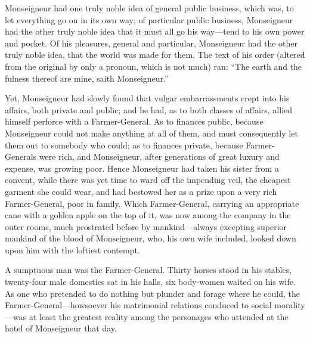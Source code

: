 Monseigneur had one truly noble idea of general public business,
which was, to let everything go on in its own way; of particular
public business, Monseigneur had the other truly noble idea that it
must all go his way---tend to his own power and pocket.  Of his
pleasures, general and particular, Monseigneur had the other truly
noble idea, that the world was made for them.  The text of his order
(altered from the original by only a pronoun, which is not much) ran:
``The earth and the fulness thereof are mine, saith Monseigneur.''

Yet, Monseigneur had slowly found that vulgar embarrassments crept
into his affairs, both private and public; and he had, as to both
classes of affairs, allied himself perforce with a Farmer-General.
As to finances public, because Monseigneur could not make anything
at all of them, and must consequently let them out to somebody who
could; as to finances private, because Farmer-Generals were rich, and
Monseigneur, after generations of great luxury and expense, was
growing poor.  Hence Monseigneur had taken his sister from a convent,
while there was yet time to ward off the impending veil, the cheapest
garment she could wear, and had bestowed her as a prize upon a very
rich Farmer-General, poor in family.  Which Farmer-General, carrying
an appropriate cane with a golden apple on the top of it, was now
among the company in the outer rooms, much prostrated before by
mankind---always excepting superior mankind of the blood of Monseigneur,
who, his own wife included, looked down upon him with the loftiest
contempt.

A sumptuous man was the Farmer-General.  Thirty horses stood in his
stables, twenty-four male domestics sat in his halls, six body-women
waited on his wife.  As one who pretended to do nothing but plunder
and forage where he could, the Farmer-General---howsoever his
matrimonial relations conduced to social morality---was at least the
greatest reality among the personages who attended at the hotel of
Monseigneur that day.

